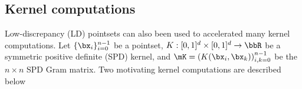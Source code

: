 \documentclass[acmsmall]{acmart}
\begin{document}

\subsection{Kernel computations} 

Low-discrepancy (LD) pointsets can also been used to accelerated many kernel computations. Let $\{\bx_i\}_{i=0}^{n-1}$ be a pointset, $K: [0,1]^d \times [0,1]^d \to \bbR$ be a symmetric positive definite (SPD) kernel, and $\mK = \left(K(\bx_i,\bx_k)\right)_{i,k=0}^{n-1}$ be the $n \times n$ SPD Gram matrix. Two motivating kernel computations are described below
\end{document}
